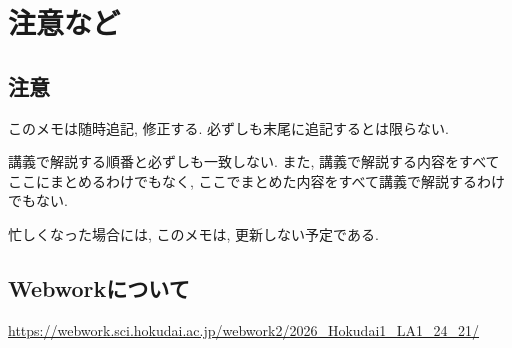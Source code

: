 \chapter{注意など}
\section{注意}
このメモは随時追記, 修正する.
必ずしも末尾に追記するとは限らない.

講義で解説する順番と必ずしも一致しない.
また, 講義で解説する内容をすべてここにまとめるわけでもなく,
ここでまとめた内容をすべて講義で解説するわけでもない.

忙しくなった場合には,
このメモは,
更新しない予定である.


\section{Webworkについて}
\url{https://webwork.sci.hokudai.ac.jp/webwork2/2026_Hokudai1_LA1_24_21/}
